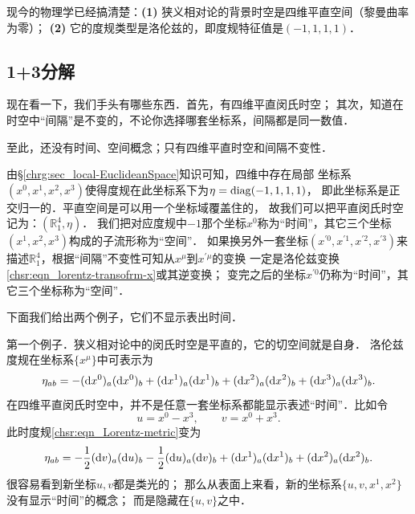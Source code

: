 现今的物理学已经搞清楚：{\bfseries (1)} 狭义相对论的背景时空是四维平直空间（黎曼曲率为零）；
{\bfseries (2)} 它的度规类型是洛伦兹的，即度规特征值是$(-1,1,1,1)$．




\subsection{1+3分解}\label{chsr:sec_1+3decom}
现在看一下，我们手头有哪些东西．首先，有四维平直闵氏时空；
其次，知道在时空中“间隔”是不变的，不论你选择哪套坐标系，间隔都是同一数值．

至此，还没有时间、空间概念；只有四维平直时空和间隔不变性．

由\S\ref{chrg:sec_local-EuclideanSpace}知识可知，四维中存在局部
坐标系$(x^0,x^1, x^2, x^3)$使得度规在此坐标系下为$\eta={\rm diag}(-1,1,1,1)$，
即此坐标系是正交归一的．平直空间是可以用一个坐标域覆盖住的，
故我们可以把平直闵氏时空记为：$(\mathbb{R}^4_1,\eta)$．
我们把对应度规中$-1$那个坐标$x^0$称为“时间”，其它三个坐标$(x^1, x^2, x^3)$构成的子流形称为“空间”．
如果换另外一套坐标$(x^{\prime 0},x^{\prime 1}, x^{\prime 2}, x^{\prime 3})$来
描述$\mathbb{R}^4_1$，根据“间隔”不变性可知从$x^\mu$到$x^{\prime \mu}$的变换
一定是洛伦兹变换\eqref{chsr:eqn_lorentz-transofrm-x}或其逆变换；
变完之后的坐标$x^{\prime 0}$仍称为“时间”，其它三个坐标称为“空间”．


下面我们给出两个例子，它们不显示表出时间．

第一个例子．狭义相对论中的闵氏时空是平直的，它的切空间就是自身．
洛伦兹度规在坐标系$\{x^\mu\}$中可表示为
\begin{equation}\label{chsr:eqn_Lorentz-metric}
	\eta_{ab} = -({\rm d}x^0)_a ({\rm d}x^0)_b+({\rm d}x^1)_a({\rm d}x^1)_b
	+({\rm d}x^2)_a ({\rm d}x^2)_b+({\rm d}x^3)_a({\rm d}x^3)_b .
\end{equation}
在四维平直闵氏时空中，并不是任意一套坐标系都能显示表述“时间”．比如令
\begin{equation}
	u= x^0 - x^3, \qquad v= x^0 + x^3.
\end{equation}
此时度规\eqref{chsr:eqn_Lorentz-metric}变为
\begin{equation}\label{chsr:eqn_Lorentz-metric-light}
	\eta_{ab} = -\frac{1}{2}({\rm d}v)_a ({\rm d}u)_b
	-\frac{1}{2}({\rm d}u)_a ({\rm d}v)_b
	+({\rm d}x^1)_a({\rm d}x^1)_b +({\rm d}x^2)_a ({\rm d}x^2)_b.
\end{equation}
很容易看到新坐标$u,v$都是类光的；
那么从表面上来看，新的坐标系$\{u,v,x^1,x^2\}$没有显示“时间”的概念；
而是隐藏在$\{u,v\}$之中．

